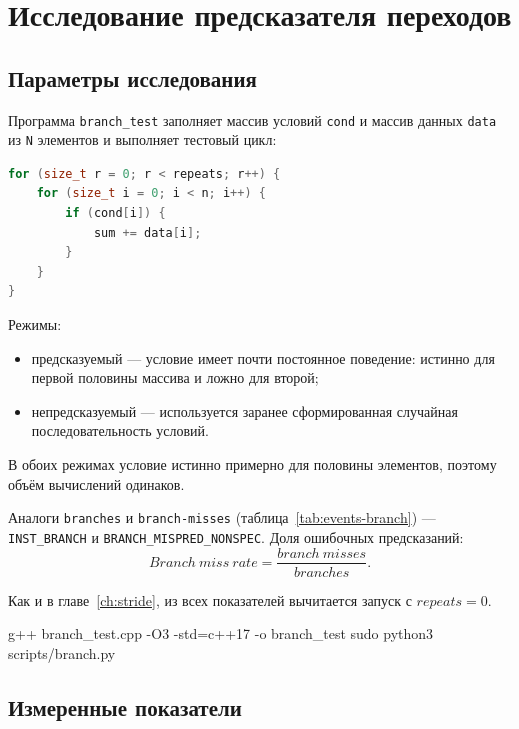 \chapter{Исследование предсказателя переходов}
\label{ch:branch}

\section{Параметры исследования}

Программа \texttt{branch\_test} заполняет массив условий \texttt{cond} и массив данных \texttt{data} из \texttt{N} элементов и выполняет тестовый цикл:

\begin{lstlisting}[style=code, language=C++]
for (size_t r = 0; r < repeats; r++) {
    for (size_t i = 0; i < n; i++) {
        if (cond[i]) {
            sum += data[i];
        }
    }
}
\end{lstlisting}

Режимы:
\begin{itemize}
	\item предсказуемый --- условие имеет почти постоянное поведение: истинно для первой половины массива и ложно для второй;
	\item непредсказуемый --- используется заранее сформированная случайная последовательность условий.
\end{itemize}

В обоих режимах условие истинно примерно для половины элементов, поэтому объём вычислений одинаков.

Аналоги \texttt{branches} и \texttt{branch-misses} (таблица~\ref{tab:events-branch}) --- \texttt{INST\_BRANCH} и \texttt{BRANCH\_MISPRED\_NONSPEC}.
Доля ошибочных предсказаний:
$$
\mathit{Branch\ miss\ rate} = \frac{\mathit{branch\ misses}}{\mathit{branches}}.
$$

Как и в главе~\ref{ch:stride}, из всех показателей вычитается запуск с $\mathit{repeats} = 0$.

\begin{commands}
g++ branch_test.cpp -O3 -std=c++17 -o branch_test
sudo python3 scripts/branch.py
\end{commands}


\section{Измеренные показатели}

